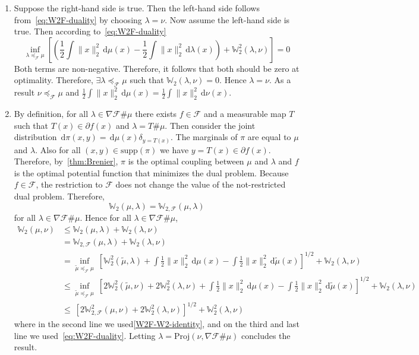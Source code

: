 \documentclass[10pt]{article}
\newcommand{\ud}{\,\mathrm{d}}
\newcommand{\norm}[1]{\|#1\|}
\renewcommand{\tilde}{\widetilde}
\newcommand{\W}{\mathds{W}}
\newcommand{\calF}{\mathcal{F}}
\numberwithin{equation}{section}
\begin{document}
\begin{enumerate}
\item Suppose the right-hand side is true. Then the left-hand side follows from~\eqref{eq:W2F-duality} by choosing $\lambda = \nu$. Now assume the left-hand side is true. Then according to~\eqref{eq:W2F-duality} 
 \begin{equation*}
 \inf_{\lambda \preceq_{\calF}\mu } \left[\left(\frac{1}{2}\int \norm{x}_2^2 \ud \mu(x) - \frac{1}{2}\int \norm{x}_2^2 \ud \lambda (x)\right) + \W^2_2(\lambda,\nu) \right] = 0
 \end{equation*}
Both terms are non-negative. Therefore, it follows that both should be zero at optimality. Therefore, $\exists \lambda \preceq_\calF \mu$ such that $\W_2(\lambda,\nu)=0$. Hence $\lambda = \nu$. As a result $\nu \preceq_\calF \mu$ and $\frac{1}{2}\int \norm{x}_2^2 \ud \mu(x) = \frac{1}{2}\int \norm{x}_2^2 \ud \nu (x)$.

\item By definition, for all $\lambda \in \nabla \calF \# \mu$ there exists $f \in \calF$ and a measurable map $T$ such that $T(x) \in \partial f(x)$ and $\lambda = T\#\mu$. Then consider the joint distribution $\ud \pi(x,y) = \ud \mu(x)\delta_{y=T(x)}$. The marginals of $\pi$ are equal to $\mu$ and $\lambda$. Also for all $(x,y) \in \text{supp}(\pi)$ we have $y=T(x)\in \partial f(x)$. 
Therefore, by~\autoref{thm:Brenier}, $\pi$ is the optimal coupling between $\mu$ and $\lambda$ and $f$ is the optimal potential function that minimizes the dual problem. Because $f \in \calF$, the restriction to $\calF$ does not change the value of the not-restricted dual problem. Therefore, 
\begin{equation}\label{W2F-W2-identity}
\W_2(\mu,\lambda) = \W_{2,\calF}(\mu,\lambda)
\end{equation}
for all $\lambda \in \nabla \calF \# \mu$. Hence for all $\lambda \in \nabla \calF \# \mu$,
\begin{align*}
\W_2(\mu,\nu) &\leq \W_2(\mu,\lambda) + \W_2(\lambda,\nu) \\
&= \W_{2,\calF}(\mu,\lambda) + \W_2(\lambda,\nu)\\
&= \inf_{\tilde{\mu} \preceq_\calF \mu} ~\left[\W_2^2(\tilde{\mu},\lambda) + \int \frac{1}{2}\norm{x}_2^2 \ud \mu(x) -\int \frac{1}{2}\norm{x}_2^2 \ud \tilde{\mu}(x) \right]^{1/2} + \W_2(\lambda,\nu)\\
&\leq \inf_{\tilde{\mu} \preceq_\calF \mu} ~\left[2\W_2^2(\tilde{\mu},\nu) + 2\W_2^2(\lambda,\nu)+ \int \frac{1}{2}\norm{x}_2^2 \ud \mu(x) -\int \frac{1}{2}\norm{x}_2^2 \ud \tilde{\mu}(x) \right]^{1/2} + \W_2(\lambda,\nu)\\
&\leq ~\left[2\W^2_{2,\calF}({\mu},\nu) + 2\W_2^2(\lambda,\nu) \right]^{1/2} + \W_2^2(\lambda,\nu)
\end{align*}
where in the second line we used\eqref{W2F-W2-identity}, and on the third and last line we used~\eqref{eq:W2F-duality}. Letting $\lambda = \text{Proj}(\nu,\nabla \calF \# \mu)$ concludes the result. 
\end{enumerate}
\end{document}
